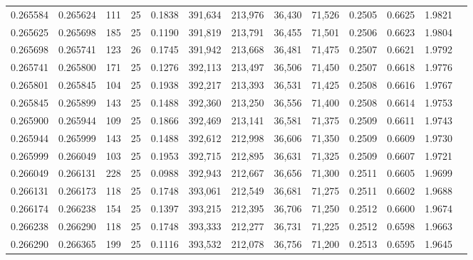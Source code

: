 \begin{tabular}{rrrrrrrrrrrrr}
0.265584 & 0.265624 &   111 &  25 &                                     0.1838 & 391,634 & 213,976 &  36,430 &  71,526 & 0.2505 & 0.6625 & 1.9821 \\
0.265625 & 0.265698 &   185 &  25 &                                     0.1190 & 391,819 & 213,791 &  36,455 &  71,501 & 0.2506 & 0.6623 & 1.9804 \\
0.265698 & 0.265741 &   123 &  26 &                                     0.1745 & 391,942 & 213,668 &  36,481 &  71,475 & 0.2507 & 0.6621 & 1.9792 \\
0.265741 & 0.265800 &   171 &  25 &                                     0.1276 & 392,113 & 213,497 &  36,506 &  71,450 & 0.2507 & 0.6618 & 1.9776 \\
0.265801 & 0.265845 &   104 &  25 &                                     0.1938 & 392,217 & 213,393 &  36,531 &  71,425 & 0.2508 & 0.6616 & 1.9767 \\
0.265845 & 0.265899 &   143 &  25 &                                     0.1488 & 392,360 & 213,250 &  36,556 &  71,400 & 0.2508 & 0.6614 & 1.9753 \\
0.265900 & 0.265944 &   109 &  25 &                                     0.1866 & 392,469 & 213,141 &  36,581 &  71,375 & 0.2509 & 0.6611 & 1.9743 \\
0.265944 & 0.265999 &   143 &  25 &                                     0.1488 & 392,612 & 212,998 &  36,606 &  71,350 & 0.2509 & 0.6609 & 1.9730 \\
0.265999 & 0.266049 &   103 &  25 &                                     0.1953 & 392,715 & 212,895 &  36,631 &  71,325 & 0.2509 & 0.6607 & 1.9721 \\
0.266049 & 0.266131 &   228 &  25 &                                     0.0988 & 392,943 & 212,667 &  36,656 &  71,300 & 0.2511 & 0.6605 & 1.9699 \\
0.266131 & 0.266173 &   118 &  25 &                                     0.1748 & 393,061 & 212,549 &  36,681 &  71,275 & 0.2511 & 0.6602 & 1.9688 \\
0.266174 & 0.266238 &   154 &  25 &                                     0.1397 & 393,215 & 212,395 &  36,706 &  71,250 & 0.2512 & 0.6600 & 1.9674 \\
0.266238 & 0.266290 &   118 &  25 &                                     0.1748 & 393,333 & 212,277 &  36,731 &  71,225 & 0.2512 & 0.6598 & 1.9663 \\
0.266290 & 0.266365 &   199 &  25 &                                     0.1116 & 393,532 & 212,078 &  36,756 &  71,200 & 0.2513 & 0.6595 & 1.9645 \\

\end{tabular}
